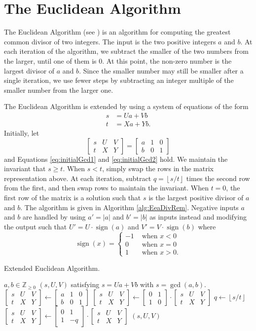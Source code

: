 \documentclass{ucalgthes1}
\theoremstyle{definition}
\DeclareMathOperator{\sign}{sign}
\newcommand{\ZZgez}{\mathbb{Z}_{\ge 0}}
\newcommand{\matrixtt}[4]{\left[ \begin{array}{rr} #1 & #2 \\ #3 & #4 \end{array} \right]}
\newcommand{\matrixThreeTwo}[6]{\left[ \begin{array}{rrr} #1 & #2 & #3 \\ #4 & #5 & #6 \end{array} \right]}
\newcommand{\floor}[1]{\left\lfloor #1 \right\rfloor}
\begin{document}
\section{The Euclidean Algorithm}
\label{sec:gcdEEA}

The Euclidean Algorithm (see \cite[\S 9.3.2]{Cohen2006}) is an algorithm for computing the greatest common divisor of two integers.  The input is the two positive integers $a$ and $b$.  At each iteration of the algorithm, we subtract the smaller of the two numbers from the larger, until one of them is 0. At this point, the non-zero number is the largest divisor of $a$ and $b$.  Since the smaller number may still be smaller after a single iteration, we use fewer steps by subtracting an integer multiple of the smaller number from the larger one.

The Euclidean Algorithm is extended by using a system of equations of the form
\begin{align}
s &= Ua + Vb \label{eq:initialGcd1} \\
t &= Xa + Yb. \label{eq:initialGcd2}
\end{align}
Initially, let
\[
\matrixThreeTwo{s}{U}{V}{t}{X}{Y} = \matrixThreeTwo{a}{1}{0}{b}{0}{1}
\]
and Equations \eqref{eq:initialGcd1} and \eqref{eq:initialGcd2} hold.  We maintain the invariant that $s \ge t$.  When $s < t$, simply swap the rows in the matrix representation above.  At each iteration, subtract $q = \floor{s/t}$ times the second row from the first, and then swap rows to maintain the invariant.  When $t=0$, the first row of the matrix is a solution such that $s$ is the largest positive divisor of $a$ and $b$.  The algorithm is given in Algorithm \ref{alg:EeaDivRem}.  Negative inputs $a$ and $b$ are handled by using $a' = |a|$ and $b' = |b|$ as inputs instead and modifying the output such that $U' = U \cdot \sign(a)$ and $V' = V \cdot \sign(b)$ where
\[
	\sign(x) = \begin{cases}
		-1 & \textrm{ when } x < 0 \\
		0 & \textrm{ when } x = 0 \\
		1 & \textrm{ when } x > 0.
	\end{cases}
\]


\begin{algorithm}[htb]
\caption{Extended Euclidean Algorithm.}
\label{alg:EeaDivRem}
\begin{algorithmic}[1]
\Require $a,b \in \ZZgez$
\Ensure $(s, U, V)$ satisfying $s = Ua + Vb$ with $s = \gcd(a, b)$.
\State $\matrixThreeTwo{s}{U}{V}{t}{X}{Y} \gets 
        \matrixThreeTwo{a}{1}{0}{b}{0}{1}$
	\State $\matrixThreeTwo{s}{U}{V}{t}{X}{Y} \gets
	        \matrixtt{0}{1}{1}{0} \cdot \matrixThreeTwo{s}{U}{V}{t}{X}{Y}$
\EndIf
{}
	\State $q \gets \floor{s / t}$
	\State $\matrixThreeTwo{s}{U}{V}{t}{X}{Y} \gets \matrixtt{0}{1}{1}{-q} \cdot
		    \matrixThreeTwo{s}{U}{V}{t}{X}{Y}$ 
\EndWhile
\State \Return $(s, U, V)$ 
\end{algorithmic}
\end{algorithm}
\end{document}
